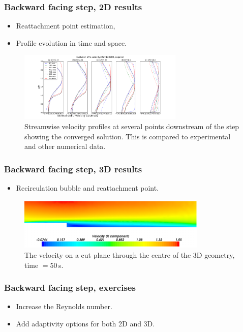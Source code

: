 %
\begin{frame}
    \frametitle{Backward facing step, 2D results}
\begin{itemize}
\item Reattachment point estimation,
\item Profile evolution in time and space.
\end{itemize}
\begin{figure}
\centering
\includegraphics[width=0.7\textwidth]{./backward_facing_step/velocity_profiles_kim_kepsilon}
\caption{Streamwise velocity profiles at several points downstream of the step showing the converged solution.  This is compared to experimental and other numerical data.}
\end{figure}

\end{frame}
%
\begin{frame}
    \frametitle{Backward facing step, 3D results}
\begin{itemize}
\item Recirculation bubble and reattachment point.
\end{itemize}

\begin{figure}
\centering
\includegraphics[width=0.8\textwidth]{./backward_facing_step/velo-magnitude-3d-50sec}
\caption{The velocity on a cut plane through the centre of the 3D geometry, time $=50\,$s.}
\end{figure}

\end{frame}
%
\begin{frame}
    \frametitle{Backward facing step, exercises}
\begin{itemize}
\item Increase the Reynolds number.
\item Add adaptivity options for both 2D and 3D.
\end{itemize}

\end{frame}

